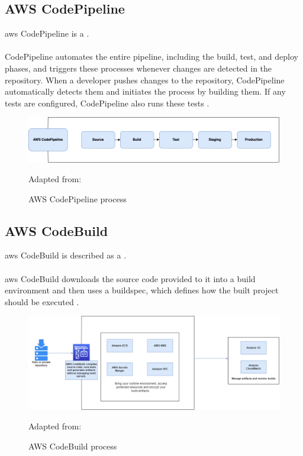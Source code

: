 \subsection{AWS CodePipeline}
\acrshort{aws} CodePipeline is a  \cite{AWSCodePipeline}.
\\~\\
CodePipeline automates the entire \gls{pipeline}, including the build, test, and deploy phases, and triggers these processes whenever changes are detected in the repository. When a developer pushes changes to the repository, CodePipeline automatically detects them and initiates the process by building them. If any tests are configured, CodePipeline also runs these tests \cite{AWSCodePipeline1}.
\begin{figure}[H]
    \centering
    \includegraphics[scale=0.4]{Images/CodePipeline.png}
    \caption{AWS CodePipeline process}Adapted from: \cite{AWSCodePipeline2}
    \label{fig: AWS CodePipeline Process}
\end{figure}

\subsection{AWS CodeBuild}
\acrshort{aws} CodeBuild is described as a  \cite{AWSCodeBuild}.
\\~\\
\acrshort{aws} CodeBuild downloads the source code provided to it into a build environment and then uses a \gls{buildspec}, which defines how the built project should be executed \cite{AWSCodeBuild1}.
\begin{figure}[H]
    \centering
    \includegraphics[scale=0.3]{Images/Codebuild.png}
    \caption{AWS CodeBuild process} Adapted from: \cite{AWSCodeBuild}
    \label{fig: AWS CodeBuild Process}
\end{figure}

